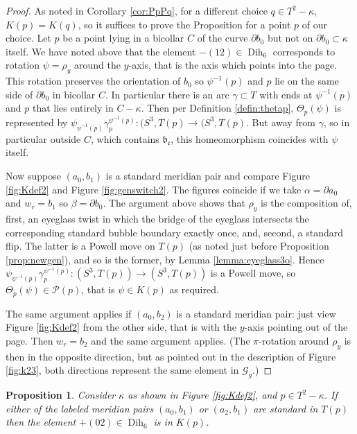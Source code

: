 \documentclass[12pt]{amsart}
\newtheorem{prop}[thm]{Proposition}
\newcommand{\calG}{\mathcal G}
\newcommand{\calP}{\mathcal P}
\newcommand{\bdd}{\mbox{$\partial$}}
\newcommand{\Dih}{\operatorname{Dih}}
\newcommand{\frb}{\mathfrak{b}}
\newcommand{\frc}{\mbox{$\mathfrak{c}$}}
\begin{document}
    \begin{proof}   As noted in Corollary \ref{cor:PpPq}, for a different choice $q \in T^2 - \kappa$, $K(p) = K(q)$, so it suffices to prove the Proposition for a point $p$ of our choice.  Let $p$ be a point lying in a bicollar $C$ of the curve $\bdd b_0$ but not on $\bdd b_0 \subset \kappa$ itself.  We have noted above that the element $-(12) \in \Dih_6$ corresponds to rotation $\psi = \rho_y$ around the $y$-axis, that is the axis which points into the page.  This rotation preserves the orientation of $b_0$ so $\psi^{-1}(p)$ and $p$ lie on the same side of $\bdd b_0$ in bicollar $C$.  In particular there is an arc $\gamma \subset T$ with ends at $\psi^{-1}(p)$ and $p$ that lies entirely in $C - \kappa$.    Then per Definition \ref{defin:thetap}, $\Theta_p(\psi)$ is represented by $\psi_{\psi^{-1}(p)} {\gamma}_p^{\psi^{-1}(p)}:(S^3, T(p) \to (S^3, T(p)$.  But away from $\gamma$, so in particular outside $C$, which contains $\frb_{\frc}$, this homeomorphism coincides with $\psi$ itself.  
    
    Now suppose $(a_0, b_1)$ is a standard meridian pair and compare Figure \ref{fig:Kdef2} and Figure \ref{fig:genswitch2}.  The figures coincide if we take $\alpha = \bdd a_0$ and $w_r = b_1$ so $\beta = \bdd b_0$.  The argument above shows that $\rho_y$ is the composition of, first, an eyeglass twist in which the bridge of the eyeglass intersects the corresponding standard bubble boundary exactly once, and, second, a standard flip.   The latter is a Powell move on $T(p)$ (as noted just before Proposition \ref{prop:newgen}), and so is the former, by Lemma \ref{lemma:eyeglass3o}.  Hence $\psi_{\psi^{-1}(p)} {\gamma}_p^{\psi^{-1}(p)}:(S^3, T(p)) \to (S^3, T(p))$ is a Powell move, so $\Theta_p(\psi) \in \calP(p)$, that is $\psi \in K(p)$ as required.    
    
   The same argument applies if $(a_0, b_2)$ is a standard meridian pair: just view Figure \ref{fig:Kdef2} from the other side, that is with the $y$-axis pointing out of the page.  Then $w_r = b_2$ and the same argument applies.  (The $\pi$-rotation around $\rho_y$ is then in the opposite direction, but as pointed out in the description of Figure \ref{fig:k23}, both directions represent the same element in $\calG_g$.)
\end{proof}

   \begin{prop}  \label{prop:+02} Consider $\kappa$ as shown in Figure \ref{fig:Kdef2}, and $p \in T^2 - \kappa$.  If either of the labeled meridian pairs $(a_0, b_1)$ or $(a_2, b_1)$ are standard in $T(p)$ then the element $+(02) \in \Dih_6$ is in $K(p)$.      
   \end{prop}
   
\end{document}
